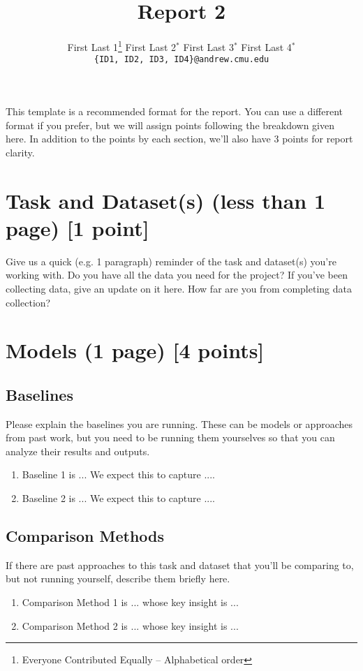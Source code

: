 \documentclass[11pt,a4paper]{article}
\title{Report 2}
\author{
  First Last 1\thanks{\hspace{4pt}Everyone Contributed Equally -- Alphabetical order} \hspace{2em} First Last 2$^*$ \hspace{2em} First Last 3$^*$ \hspace{2em} First Last 4$^*$ \\
  \texttt{\{ID1, ID2, ID3, ID4\}@andrew.cmu.edu}
  }
\date{}
\begin{document}
\maketitle
This template is a recommended format for the report. You can use a different format if you prefer, but we will assign points following the breakdown given here. 
In addition to the points by each section, we'll also have 3 points for report clarity.

\section{Task and Dataset(s) (less than 1 page) [1 point]}
Give us a quick (e.g. 1 paragraph) reminder of the task and dataset(s) you're working with. 
Do you have all the data you need for the project?
If you've been collecting data, give an update on it here. How far are you from completing data collection?

\clearpage

\section{Models (1 page) [4 points]}

\subsection{Baselines}
Please explain the baselines you are running. These can be models or approaches from past work, but you need to be running them yourselves so that you can analyze their results and outputs.

\begin{enumerate}
  \item Baseline 1 is ...  We expect this to capture ....
  \item Baseline 2 is ...  We expect this to capture ....
\end{enumerate}

\subsection{Comparison Methods}

If there are past approaches to this task and dataset that you'll be comparing to, but not running yourself, describe them briefly here.

\begin{enumerate}
  \item Comparison Method 1 is ... whose key insight is ...
  \item Comparison Method 2 is ... whose key insight is ...
\end{enumerate}
\end{document}
